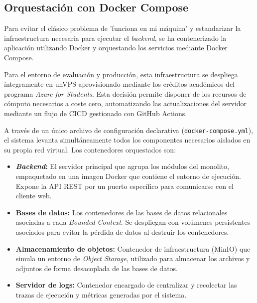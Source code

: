 \subsection{Orquestación con Docker Compose}
Para evitar el clásico problema de 'funciona en mi máquina' y estandarizar la infraestructura necesaria para ejecutar el \emph{backend}, se ha contenerizado la aplicación utilizando Docker y orquestando los servicios mediante Docker Compose. 

Para el entorno de evaluación y producción, esta infraestructura se despliega íntegramente en un\ac{VPS} aprovisionado mediante los créditos académicos del programa \emph{Azure for Students}. Esta decisión permite disponer de los recursos de cómputo necesarios a coste cero, automatizando las actualizaciones del servidor mediante un flujo de \ac{CICD} gestionado con GitHub Actions.

A través de un único archivo de configuración declarativa (\texttt{docker-compose.yml}), el sistema levanta simultáneamente todos los componentes necesarios aislados en su propia red virtual. Los contenedores orquestados son:
\begin{itemize}
    \item \textbf{\emph{Backend}:} El servidor principal que agrupa los módulos del monolito, empaquetado en una imagen Docker que contiene el entorno de ejecución. Expone la \ac{API} REST por un puerto específico para comunicarse con el cliente web.
    \item \textbf{Bases de datos:} Los contenedores de las bases de datos relacionales asociadas a cada \emph{Bounded Context}. Se despliegan con volúmenes persistentes asociados para evitar la pérdida de datos al destruir los contenedores.
    \item \textbf{Almacenamiento de objetos:} Contenedor de infraestructura (MinIO) que simula un entorno de \emph{Object Storage}, utilizado para almacenar los archivos y adjuntos de forma desacoplada de las bases de datos.
    \item \textbf{Servidor de logs:} Contenedor encargado de centralizar y recolectar las trazas de ejecución y métricas generadas por el sistema.
\end{itemize}

